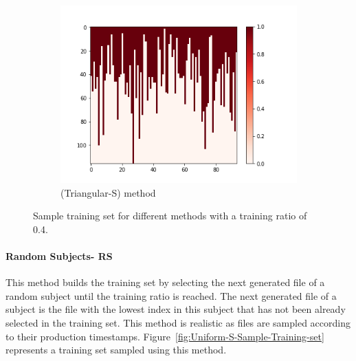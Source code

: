 \documentclass[10pt, conference, compsocconf]{IEEEtran}
\begin{document}
\begin{figure}[h!]
\begin{subfigure}[b]{0.4\linewidth}
  		\includegraphics[width=\columnwidth]{figures/5vs7_random-triangular-smallest_04_training}
  		\caption{(Triangular-S) method}
  		\label{fig:triangular-S-Sample-Training-set}
	\end{subfigure}
	\caption{Sample training set for different methods with a training ratio of 0.4.}		
\end{figure}

\paragraph{Random Subjects- RS} This method builds the 
training set by selecting the next generated file of a random subject 
until the training ratio is reached. The next generated file of a 
subject is the file with the lowest index in this subject that has not 
been already selected in the training set. This method is realistic as 
files are sampled according to their production timestamps. 
Figure~\ref{fig:Uniform-S-Sample-Training-set} represents a training 
set sampled using this method.
\end{document}
